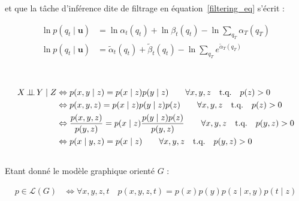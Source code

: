 \documentclass[12pt,a4paper,onecolumn]{article}
\begin{document}
et que la tâche d'inférence dite de filtrage en équation~\eqref{filtering_eq} s'écrit :

\begin{equation}
	\begin{split}
		\ln p(q_t \mid \bm{u}) &= \ln\alpha_t(q_t) + \ln\beta_t(q_t) - \ln \sum_{q_T}\alpha_T(q_T)\\
		\ln p(q_t \mid \bm{u}) &= \tilde{\alpha}_t(q_t) + \tilde{\beta}_t(q_t) - \ln \sum_{q_T}e^{\tilde{\alpha}_T(q_T)}\\
	\end{split}
\end{equation}

\section{}

\subsection{}

\begin{equation}
	\begin{split}
		X \,\bot\!\!\!\bot\, Y \mid Z &\Leftrightarrow p(x, y \mid z) = p(x \mid z) p(y \mid z) \qquad \forall x, y, z \quad  \text{t.q.} \quad p(z) > 0 \\
		&\Leftrightarrow p(x, y, z) = p(x \mid z) p(y \mid z) p(z)\qquad \forall x, y, z \quad  \text{t.q.} \quad p(z) > 0 \\
		&\Leftrightarrow \frac{p(x, y ,z)}{p(y , z)} = p(x \mid z) \frac{p(y \mid z) p(z)}{p(y, z)} \qquad \forall x, y, z \quad  \text{t.q.} \quad p(y, z) > 0 \\
		&\Leftrightarrow p(x \mid y, z) = p(x \mid z) \qquad \forall x, y, z \quad  \text{t.q.} \quad p(y, z) > 0 \\
	\end{split}
\end{equation}

\subsection{}

Etant donné le modèle graphique orienté \(G\) :

\begin{equation}
	\begin{split}
		p \in \mathcal{L}(G) &\Leftrightarrow \forall x, y, z, t \quad p(x, y, z, t) = p(x)p(y)p(z \mid  x, y) p(t \mid z)
	\end{split}
\end{equation}
\end{document}
